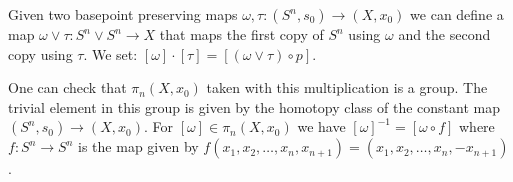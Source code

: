 \documentclass[11pt, letterpaper, oneside]{report}
\theoremstyle{pplain}
\theoremstyle{ddefinition}
\theoremstyle{nnn}
\theoremstyle{eexercise}
\begin{document}


Given two basepoint preserving maps $\omega, \tau\colon (S^{n}, s_{0}) \to (X, x_{0})$ we can define a map 
$\omega\vee \tau \colon S^{n}\vee S^{n} \to X$ that maps the first copy of $S^{n}$ using $\omega$ and the second
copy using $\tau$. We set: $[\omega]\cdot [\tau] = [(\omega\vee \tau) \circ p]$. 


One can check that $\pi_{n}(X, x_{0})$ taken with this multiplication is a group. The trivial element in this group 
is given by the homotopy class of the constant map $(S^{n}, s_{0}) \to (X, x_{0})$. For $[\omega]\in \pi_{n}(X, x_{0})$ 
we have $[\omega]^{-1} = [\omega\circ f]$ where $f\colon S^{n} \to S^{n}$ is the map given by 
$f(x_{1}, x_{2}, \dots, x_{n}, x_{n+1}) = (x_{1}, x_{2}, \dots, x_{n}, -x_{n+1})$. 
\end{document}
